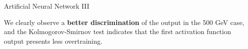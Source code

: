 \documentclass[handout,8 pt]{beamer}
\begin{document}
\begin{frame}{Artificial Neural Network III}
   	\hspace{4pt}
   \begin{minipage}[c]{.02\linewidth}
	\begin{exampleblock}{}  \end{exampleblock}
   \end{minipage}
   \hspace{5pt}
	\begin{minipage}[c]{.44\linewidth}
   \end{minipage} \hfill
   \hspace{10pt}
   \begin{minipage}[c]{.44\linewidth}
   \end{minipage} \hfill \vfill
	
	\justifying
	We clearly observe a \textbf{better discrimination} of the output in the 500 GeV case, and the Kolmogorov-Smirnov test indicates that the first activation function output presents less overtraining. \vfill

\end{frame}
\end{document}
